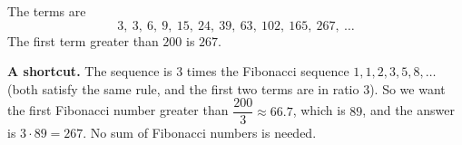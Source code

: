 The terms are
\[
3,\ 3,\ 6,\ 9,\ 15,\ 24,\ 39,\ 63,\ 102,\ 165,\ 267,\ \dots
\]
The first term greater than $200$ is $\boxed{267}$.

\textbf{A shortcut.} The sequence is $3$ times the Fibonacci sequence $1,1,2,3,5,8,\dots$ (both satisfy the same rule, and the first two terms are in ratio $3$). So we want the first Fibonacci number greater than $\dfrac{200}{3}\approx66.7$, which is $89$, and the answer is $3\cdot89=267$. No sum of Fibonacci numbers is needed.
